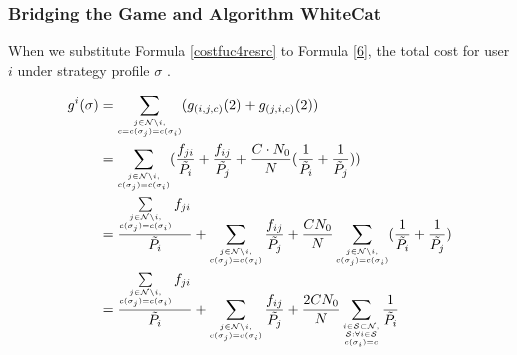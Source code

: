 \subsubsection*{Bridging the Game and Algorithm WhiteCat}

When we substitute Formula \ref{costfuc4resrc} to Formula \ref{6}, the total cost for user $i$ under strategy profile $\sigma$ . 

\begin{equation}
\label{cost1player}
\begin{split}
g^i(\sigma)
& = \sum_{\tiny\substack{j\in \mathcal{N}\setminus i,\\ c=c(\sigma_j)=c(\sigma_i)}} (g_{(i,j,c)}(2) + g_{(j,i,c)}(2))\\
& = \sum_{\tiny\substack{j\in \mathcal{N}\setminus i,\\ c(\sigma_j)=c(\sigma_i)}}(\dfrac{f_{ji}}{\tilde{P_i}} + \dfrac{f_{ij}}{\tilde{P_j}}+ \dfrac{C\cdot N_0}{N}(\dfrac{1}{\tilde P_i}+\dfrac{1}{\tilde P_j})) \\
& = \dfrac{\sum\limits_{\tiny\substack{j\in \mathcal{N}\setminus i,\\ c(\sigma_j)=c(\sigma_i)}}f_{ji}}{ \tilde{P_i}} + \sum_{\tiny\substack{j\in \mathcal{N}\setminus i, \\c(\sigma_j)=c(\sigma_i)}}\dfrac{f_{ij}}{\tilde{P_j}} + \dfrac{CN_0}{N}\sum_{\tiny\substack{j\in \mathcal{N}\setminus i,\\ c(\sigma_j)=c(\sigma_i)}}(\dfrac{1}{\tilde{P_i}}+\dfrac{1}{\tilde{P_j}})\\
& = \dfrac{\sum\limits_{\tiny\substack{j\in \mathcal{N}\setminus i,\\ c(\sigma_j)=c(\sigma_i)}}f_{ji}}{ \tilde{P_i}} + \sum_{\tiny\substack{j\in \mathcal{N}\setminus i,\\ c(\sigma_j)=c(\sigma_i)}}\dfrac{f_{ij}}{\tilde{P_j}} + \dfrac{2CN_0}{N}\sum_{\tiny\substack{i\in\mathcal{S}\subset\mathcal{N},\\\mathcal{S}:\forall i\in \mathcal{S}\\ c(\sigma_i)=c}}\dfrac{1}{\tilde{P_i}}\\
\end{split}
\end{equation}

